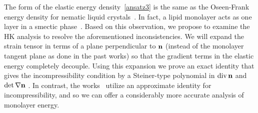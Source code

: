
The form of the elastic energy density~\eqref{ansatz3} is the same as
the Oseen-Frank energy density for nematic liquid
crystals~\cite{ANDRIENKO2018520, Tran7106, Helfrich73}. In fact, a lipid
monolayer acts as one layer in a smectic phase~\cite{REYESMATEO1995978,
Rangamani20140463, PhysRevLett.113.248102}. Based on this observation,
we propose to examine the HK analysis to resolve the aforementioned
inconsistencies. We will expand the strain tensor in terms of a plane
perpendicular to ${\bf n}$ (instead of the monolayer tangent plane as
done in the past works) so that the gradient terms in the elastic energy
completely decouple. Using this expansion we prove an exact identity
that gives the incompressibility condition by a Steiner-type polynomial
in $\operatorname{div} {\bf n}$ and $\det \nabla {\bf n}$ \cite{Fe59}. In contrast,
the works~\cite{TerziDeserno17, PhysRevE.102.042406, Hamm2000,
C9SM02079A} utilize an approximate identity for incompressibility, and
so we can offer a considerably more accurate analysis of monolayer
energy.

